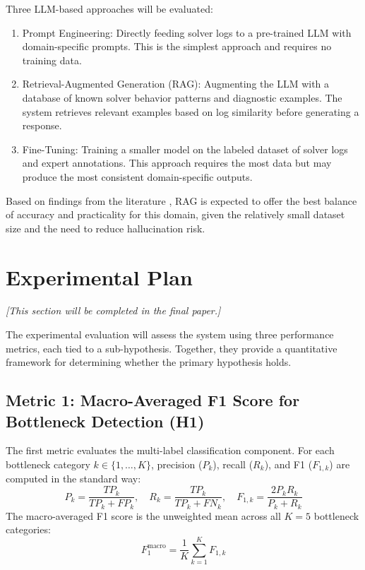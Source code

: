 \documentclass[11pt]{article}
\begin{document}
Three LLM-based approaches will be evaluated:
\begin{enumerate}
    \item Prompt Engineering: Directly feeding solver logs to a pre-trained LLM with domain-specific prompts. This is the simplest approach and requires no training data.
    \item Retrieval-Augmented Generation (RAG): Augmenting the LLM with a database of known solver behavior patterns and diagnostic examples. The system retrieves relevant examples based on log similarity before generating a response.
    \item Fine-Tuning: Training a smaller model on the labeled dataset of solver logs and expert annotations. This approach requires the most data but may produce the most consistent domain-specific outputs.
\end{enumerate}

Based on findings from the literature \cite{akhtar2025llmbasedeventloganalysis}, RAG is expected to offer the best balance of accuracy and practicality for this domain, given the relatively small dataset size and the need to reduce hallucination risk.

\section{Experimental Plan}
\label{sec:experiments}

\textit{[This section will be completed in the final paper.]}

The experimental evaluation will assess the system using three performance metrics, each tied to a sub-hypothesis. Together, they provide a quantitative framework for determining whether the primary hypothesis holds.

\subsection{Metric 1: Macro-Averaged F1 Score for Bottleneck Detection (H1)}

The first metric evaluates the multi-label classification component. For each bottleneck category $k \in \{1, \ldots, K\}$, precision ($P_k$), recall ($R_k$), and F1 ($F_{1,k}$) are computed in the standard way:
\begin{equation}
    P_k = \frac{TP_k}{TP_k + FP_k}, \quad R_k = \frac{TP_k}{TP_k + FN_k}, \quad F_{1,k} = \frac{2 P_k R_k}{P_k + R_k}
\end{equation}
The macro-averaged F1 score is the unweighted mean across all $K=5$ bottleneck categories:
\begin{equation}
    F_1^{\text{macro}} = \frac{1}{K} \sum_{k=1}^{K} F_{1,k}
\end{equation}
\end{document}
